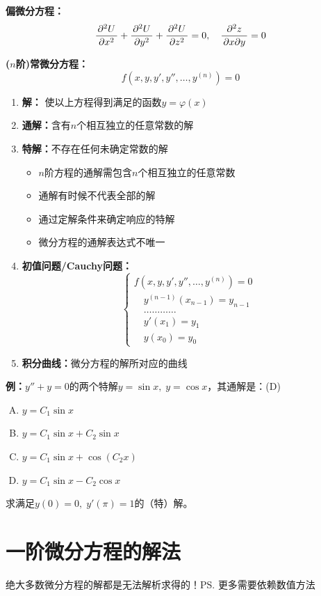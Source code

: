 {\bf 偏微分方程：} 
  $$\displaystyle\frac{\,{\partial^2U}\,}{\,{\partial x^2}\,}+\displaystyle\frac{\,{\partial^2U}\,}{\,{\partial y^2}\,}+\displaystyle\frac{\,{\partial^2U}\,}{\,{\partial z^2}\,}=0,\quad 
  \displaystyle\frac{\,{\partial^2z}\,}{\,{\partial x\partial y}\,}=0$$

{\bf ($n$阶)常微分方程：}
$$f(x,y,y',y'',\ldots,y^{(n)})=0$$

\begin{enumerate}[(1)]
  \setlength{\itemindent}{1cm}
  \item {\bf 解：} 使以上方程得到满足的函数$y=\varphi(x)$ 
  \item {\bf 通解：}含有$n$个相互独立的任意常数的解  
  \item {\bf 特解：}不存在任何未确定常数的解 
  \begin{itemize}
    \item $n$阶方程的通解需包含$n$个相互独立的任意常数
    \item 通解有时候不代表全部的解
    \item 通过定解条件来确定响应的特解
    \item 微分方程的通解表达式不唯一
  \end{itemize} 
  \item {\bf 初值问题/Cauchy问题：}
  $$
  \left\{\begin{array}{l}
  	f(x,y,y',y'',\ldots,y^{(n)})=0\\
  	\quad{y^{(n-1)}(x_{n-1})=y_{n-1}}\\
  	\quad{\ldots\ldots\ldots\ldots}\\
  	\quad{y'(x_1)=y_1}\\
  	\quad{y(x_0)=y_0}
  \end{array}\right.
  $$
  \item {\bf 积分曲线：}微分方程的解所对应的曲线
\end{enumerate}

{\bf 例：}$y''+y=0$的两个特解$y=\sin x,\;y=\cos x$，其通解是：(D)
\begin{enumerate}[(A)]
  \setlength{\itemindent}{1cm}
  \item $y=C_1\sin x$
  \item $y=C_1\sin x+C_2\sin x$
  \item $y=C_1\sin x+\cos(C_2x)$
  \item $y=C_1\sin x-C_2\cos x$
\end{enumerate}
求满足$y(0)=0,\;y'(\pi)=1$的（特）解。

\section{一阶微分方程的解法}

绝大多数微分方程的解都是无法解析求得的！\ps{更多需要依赖数值方法}

